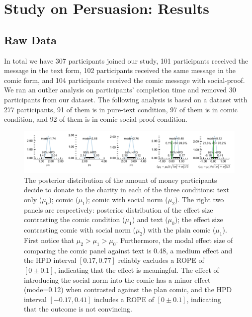 \section{Study on Persuasion: Results}
\label{sec:Study on Behavior Results}

\subsection{Raw Data}
\label{sub:Study on Behavior Raw Data}
In total we have 307 participants joined our study, 101 participants received the message in the text form, 102 participants received the same message in the comic form, and 104 participants received the comic message with social-proof. We ran an outlier analysis on participants' completion time and removed 30 participants from our dataset. The following analysis is based on a dataset with 277 participants, 91 of them is in pure-text condition, 97 of them is in comic condition, and 92 of them is in comic-social-proof condition.

\begin{figure}[htb]
	\includegraphics[width=1\textwidth]{./hari-code/new_exp_text_v_comic_v_social.pdf}
    \caption{The posterior distribution of the amount of money participants decide to donate to the charity in each of the three conditions: text only ($\mu_0$); comic ($\mu_1$); comic with social norm ($\mu_2$). The right two panels are respectively: posterior distribution of the effect size contrasting the comic condition ($\mu_1$) and text ($\mu_0$); the effect size contrasting comic with social norm ($\mu_2$) with the plain comic ($\mu_1$). First notice that $\mu_2 > \mu_1 > \mu_0$. Furthermore, the modal effect size of comparing the comic panel against text is 0.48, a medium effect and the HPD interval $[0.17, 0.77]$ reliably excludes a ROPE of $[0 \pm 0.1]$, indicating that the effect is meaningful. The effect of introducing the social norm into the comic has a minor effect (mode=0.12) when contrasted against the plan comic, and the HPD interval $[-0.17, 0.41]$ includes a ROPE of $[0 \pm 0.1]$, indicating that the outcome is not convincing.}
	\label{fig:main-experiment2-effect}
\end{figure}

